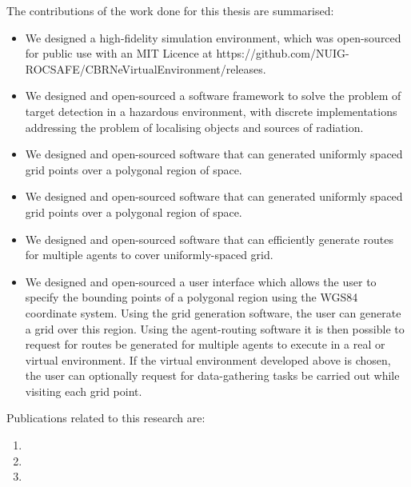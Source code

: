 The contributions of the work done for this thesis are summarised:
\begin{itemize}
    \item We designed a high-fidelity simulation environment, which was open-sourced for public use with an MIT Licence at https://github.com/NUIG-ROCSAFE/CBRNeVirtualEnvironment/releases.
    \item We designed and open-sourced a software framework to solve the problem of target detection in a hazardous environment, with discrete implementations addressing the problem of localising objects and sources of radiation.
    \item We designed and open-sourced software that can generated uniformly spaced grid points over a polygonal region of space.
    \item We designed and open-sourced software that can generated uniformly spaced grid points over a polygonal region of space.
    \item We designed and open-sourced software that can efficiently generate routes for multiple agents to cover uniformly-spaced grid.
    \item We designed and open-sourced a user interface which allows the user to specify the bounding points of a polygonal region using the WGS84 coordinate system. Using the grid generation  software, the user can generate a grid over this region. Using the agent-routing software it is then possible to request for routes be generated for multiple agents to execute in a real or virtual environment. If the virtual environment developed above is chosen, the user can optionally request for data-gathering tasks be carried out while visiting each grid point.
\end{itemize}

Publications related to this research are:
\begin{enumerate}
    \item {}
    \item {}
    \item {}

\end{enumerate}